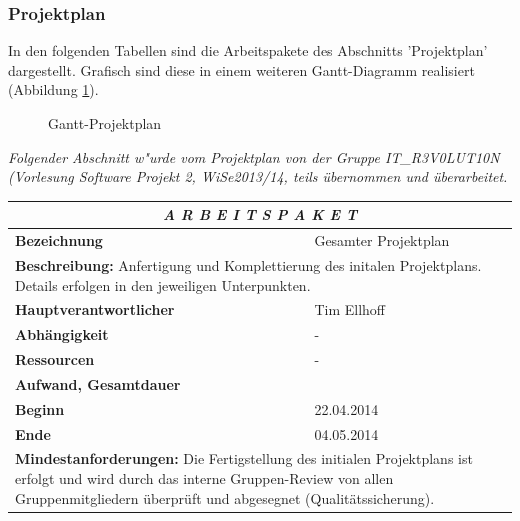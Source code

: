 \documentclass[fontsize=12pt,paper=a4,twoside]{scrartcl}
\begin{document}
\subsubsection{Projektplan}\label{aps}

In den folgenden Tabellen sind die Arbeitspakete des Abschnitts 'Projektplan' dargestellt. Grafisch sind diese in einem weiteren Gantt-Diagramm realisiert (Abbildung \ref{Gantt-Projektplan2}). \\

\begin{figure}[htbp]
\caption{Gantt-Projektplan}

\label{Gantt-Projektplan2}
\end{figure}

\textit{Folgender Abschnitt w"urde vom Projektplan von der Gruppe IT\_R3V0LUT10N (Vorlesung Software Projekt 2, WiSe2013/14, teils übernommen und überarbeitet.}


\begin{tabular}{p{7.5cm}|p{7.5cm}}\toprule
\multicolumn{2}{c}{\textbf{\textit{A R B E I T S P A K E T \quad 1}}} \\ \toprule \hline
\textbf{Bezeichnung} & Gesamter Projektplan\\\hline
\multicolumn{2}{p{15cm}}{\textbf{Beschreibung:} \newline 
Anfertigung und Komplettierung des initalen Projektplans. Details erfolgen in den jeweiligen Unterpunkten.}  \\\hline
\textbf{Hauptverantwortlicher} & Tim Ellhoff\\\hline
\textbf{Abhängigkeit} & -\\\hline
\textbf{Ressourcen} & -\\\hline
\textbf{Aufwand, Gesamtdauer} & \\\hline
\textbf{Beginn} & 22.04.2014 \\\hline
\textbf{Ende} & 04.05.2014\\\hline
\multicolumn{2}{p{15cm}}{\textbf{Mindestanforderungen: } \newline
Die Fertigstellung des initialen Projektplans ist erfolgt und wird durch das interne Gruppen-Review von allen Gruppenmitgliedern überprüft und abgesegnet (Qualitätssicherung).}  \\ \toprule
\end{tabular} \\\\
\end{document}
